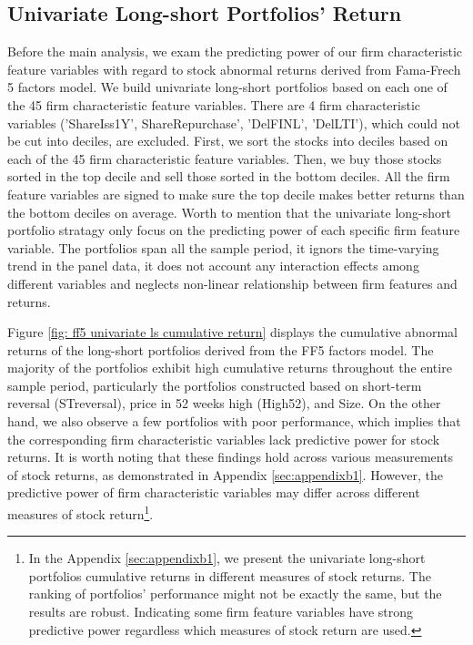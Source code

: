 \subsection{Univariate Long-short Portfolios' Return}
\label{sec: univariate ls portfolios}
Before the main analysis, we exam the predicting power of our firm characteristic feature variables with regard to stock abnormal returns derived from Fama-Frech 5 factors model. We build univariate long-short portfolios based on each one of the 45 firm characteristic feature variables. There are 4 firm characteristic variables ('ShareIss1Y',  ShareRepurchase', 'DelFINL', 'DelLTI'), which could not be cut into deciles, are excluded. First, we sort the stocks into deciles based on each of the 45 firm characteristic feature variables. Then, we buy those stocks sorted in the top decile and sell those sorted in the bottom deciles. All the firm feature variables are signed to make sure the top decile makes better returns than the bottom deciles on average. Worth to mention that the univariate long-short portfolio stratagy only focus on the predicting power of each specific firm feature variable. The portfolios span all the sample period, it ignors the time-varying trend in the panel data, it does not account any interaction effects among different variables and neglects non-linear relationship between firm features and returns. 

Figure \ref{fig: ff5 univariate ls cumulative return} displays the cumulative abnormal returns of the long-short portfolios derived from the FF5 factors model. The majority of the portfolios exhibit high cumulative returns throughout the entire sample period, particularly the portfolios constructed based on short-term reversal (STreversal), price in 52 weeks high (High52), and Size. On the other hand, we also observe a few portfolios with poor performance, which implies that the corresponding firm characteristic variables lack predictive power for stock returns. It is worth noting that these findings hold across various measurements of stock returns, as demonstrated in Appendix \ref{sec:appendixb1}. However, the predictive power of firm characteristic variables may differ across different measures of stock return\footnote{In the Appendix \ref{sec:appendixb1}, we present the univariate long-short portfolios cumulative returns in different measures of stock returns. The ranking of portfolios' performance might not be exactly the same, but the results are robust. Indicating some firm feature variables have strong predictive power regardless which measures of stock return are used.}.


